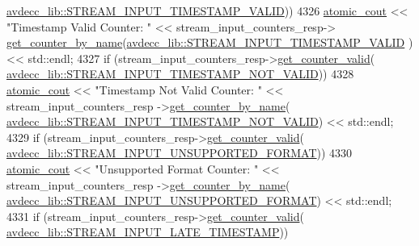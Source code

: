 \begin{DoxyCode}
      \hyperlink{namespaceavdecc__lib_a831be56dba8ac423258a9374a1202df4a113d279451bf2b134e3b7666f053747f}{avdecc\_lib::STREAM\_INPUT\_TIMESTAMP\_VALID}))
4326                     \hyperlink{cmd__line_8h_a0bc38ccc65c79ba06c6fcd7b4bf554c3}{atomic\_cout} << \textcolor{stringliteral}{"Timestamp Valid Counter: "} << stream\_input\_counters\_resp->
      \hyperlink{classavdecc__lib_1_1stream__input__counters__response_aad68050f63fc17c24527b3157d6ca8c7}{get\_counter\_by\_name}(\hyperlink{namespaceavdecc__lib_a831be56dba8ac423258a9374a1202df4a113d279451bf2b134e3b7666f053747f}{avdecc\_lib::STREAM\_INPUT\_TIMESTAMP\_VALID}
      ) << std::endl;
4327                 \textcolor{keywordflow}{if} (stream\_input\_counters\_resp->\hyperlink{classavdecc__lib_1_1stream__input__counters__response_a1a714d004a3ca8b521311ba4d3e62e93}{get\_counter\_valid}(
      \hyperlink{namespaceavdecc__lib_a831be56dba8ac423258a9374a1202df4a4ac29b18f9c5e1419921fd202751080c}{avdecc\_lib::STREAM\_INPUT\_TIMESTAMP\_NOT\_VALID}))
4328                     \hyperlink{cmd__line_8h_a0bc38ccc65c79ba06c6fcd7b4bf554c3}{atomic\_cout} << \textcolor{stringliteral}{"Timestamp Not Valid Counter: "} << stream\_input\_counters\_resp
      ->\hyperlink{classavdecc__lib_1_1stream__input__counters__response_aad68050f63fc17c24527b3157d6ca8c7}{get\_counter\_by\_name}(
      \hyperlink{namespaceavdecc__lib_a831be56dba8ac423258a9374a1202df4a4ac29b18f9c5e1419921fd202751080c}{avdecc\_lib::STREAM\_INPUT\_TIMESTAMP\_NOT\_VALID}) << std::endl;
4329                 \textcolor{keywordflow}{if} (stream\_input\_counters\_resp->\hyperlink{classavdecc__lib_1_1stream__input__counters__response_a1a714d004a3ca8b521311ba4d3e62e93}{get\_counter\_valid}(
      \hyperlink{namespaceavdecc__lib_a831be56dba8ac423258a9374a1202df4a5a8fc53c8728128a42eacecfd7b0b767}{avdecc\_lib::STREAM\_INPUT\_UNSUPPORTED\_FORMAT}))
4330                     \hyperlink{cmd__line_8h_a0bc38ccc65c79ba06c6fcd7b4bf554c3}{atomic\_cout} << \textcolor{stringliteral}{"Unsupported Format Counter: "} << stream\_input\_counters\_resp
      ->\hyperlink{classavdecc__lib_1_1stream__input__counters__response_aad68050f63fc17c24527b3157d6ca8c7}{get\_counter\_by\_name}(
      \hyperlink{namespaceavdecc__lib_a831be56dba8ac423258a9374a1202df4a5a8fc53c8728128a42eacecfd7b0b767}{avdecc\_lib::STREAM\_INPUT\_UNSUPPORTED\_FORMAT}) << std::endl;
4331                 \textcolor{keywordflow}{if} (stream\_input\_counters\_resp->\hyperlink{classavdecc__lib_1_1stream__input__counters__response_a1a714d004a3ca8b521311ba4d3e62e93}{get\_counter\_valid}(
      \hyperlink{namespaceavdecc__lib_a831be56dba8ac423258a9374a1202df4a5c1b67849a2f0369eacd9cb0a34cd35b}{avdecc\_lib::STREAM\_INPUT\_LATE\_TIMESTAMP}))

\end{DoxyCode}
